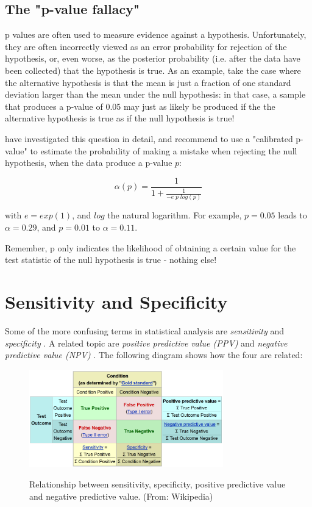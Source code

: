 \subsection{The "p-value fallacy"}

p values are often used to measure evidence against a hypothesis. Unfortunately, they are often incorrectly viewed as an error probability for rejection of the hypothesis, or, even worse, as the posterior probability (i.e. after the data have been collected) that the hypothesis is true. As an example, take the case where the alternative hypothesis is that the mean is just a fraction of one standard deviation larger than the mean under the null hypothesis: in that case, a sample that produces a p-value of 0.05 may just as likely be produced if the the alternative hypothesis is true as if the null hypothesis is true!

\cite{sellke2001} have investigated this question in detail, and recommend to use a "calibrated p-value" to estimate the probability of making a mistake when rejecting the null hypothesis, when the data produce a p-value $p$:

\begin{equation}\label{eq:pFallacy}
    \alpha(p)= \frac{1}{1 + \frac{1}{-e \; p \; log(p)}}
\end{equation}

with $e=exp(1)$, and $log$ the natural logarithm. For example, $p=0.05$ leads to $\alpha=0.29$, and $p=0.01$ to $\alpha=0.11$.

Remember, p only indicates the likelihood of obtaining a certain value for the test statistic of the null hypothesis is true - nothing else!

\section{Sensitivity and Specificity}

Some of the more confusing terms in statistical analysis are \emph{sensitivity}  and \emph{specificity} . A related topic are \emph{positive predictive value (PPV)}  and \emph{negative predictive value (NPV)} . The following diagram shows how the four are related:

\begin{figure}[ht]
  \centering
  \includegraphics[width=0.75\textwidth]{../Images/Sensitivity_Specificity_Diagram.png}\\
  \caption{Relationship between sensitivity, specificity, positive predictive value and negative predictive value. (From: Wikipedia)}\label{fig:sens_spec_diagram}
\end{figure}

